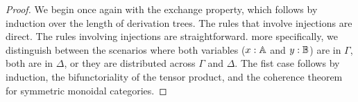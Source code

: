 \documentclass[10pt,a4paper]{amsart}
\theoremstyle{definition}
\theoremstyle{definition}
\theoremstyle{definition}
\theoremstyle{definition}
\theoremstyle{definition}
\theoremstyle{definition}
\begin{document}
\begin{proof}
  We begin once again with the exchange property, which follows by induction over the length of derivation trees. The rules that involve injections are direct. The rules involving injections are straightforward. more specifically, we distinguish between the scenarios where both variables ($x : \mathbb{A}$ and $y : \mathbb{B}$) are in $\Gamma$, both are in $\Delta$, or they are distributed across $\Gamma$ and $\Delta$.
  The fist case follows by induction, the bifunctoriality of the tensor product, and the coherence theorem for symmetric monoidal categories.


\end{proof}
\end{document}
